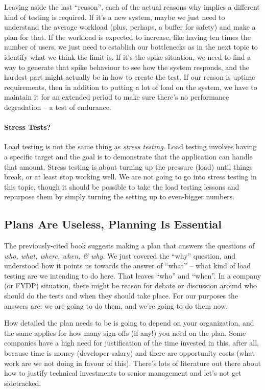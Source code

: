 Leaving aside the last ``reason'', each of the actual reasons why implies a different kind of testing is required. If it's a new system, maybe we just need to understand the average workload (plus, perhaps, a buffer for safety) and make a plan for that. If the workload is expected to increase, like having ten times the number of users, we just need to establish our bottlenecks as in the next topic to identify what we think the limit is. If it's the spike situation, we need to find a way to generate that spike behaviour to see how the system responds, and the hardest part might actually be in how to create the test. If our reason is uptime requirements, then in addition to putting a lot of load on the system, we have to maintain it for an extended period to make sure there's no performance degradation -- a test of endurance.

\paragraph{Stress Tests?} Load testing is not the same thing as \textit{stress testing}. Load testing involves having a specific target and the goal is to demonstrate that the application can handle that amount. Stress testing is about turning up the pressure (load) until things break, or at least stop working well. We are not going to go into stress testing in this topic, though it should be possible to take the load testing lessons and repurpose them by simply turning the setting up to even-bigger numbers.

\subsection*{Plans Are Useless, Planning Is Essential} The previously-cited book suggests making a plan that answers the questions of \textit{who, what, where, when, \& why}. We just covered the ``why'' question, and understood how it points us towards the answer of ``what'' -- what kind of load testing are we intending to do here. That leaves ``who'' and ``when''. In a company (or FYDP) situation, there might be reason for debate or discussion around who should do the tests and when they should take place. For our purposes the answers are: we are going to do them, and we're going to do them now.

How detailed the plan needs to be is going to depend on your organization, and the same applies for how many sign-offs (if any!) you need on the plan. Some companies have a high need for justification of the time invested in this, after all, because time is money (developer salary) and there are opportunity costs (what work are we not doing in favour of this). There's lots of literature out there about how to justify technical investments to senior management and let's not get sidetracked.

